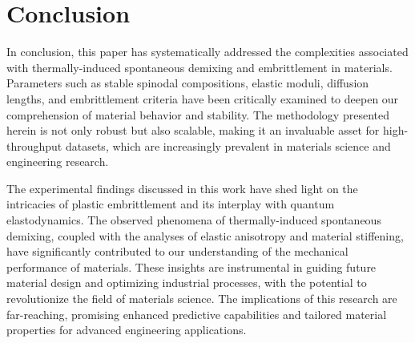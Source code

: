 \section{Conclusion}

In conclusion, this paper has systematically addressed the complexities associated with thermally-induced spontaneous demixing and embrittlement in materials. Parameters such as stable spinodal compositions, elastic moduli, diffusion lengths, and embrittlement criteria have been critically examined to deepen our comprehension of material behavior and stability. The methodology presented herein is not only robust but also scalable, making it an invaluable asset for high-throughput datasets, which are increasingly prevalent in materials science and engineering research.

The experimental findings discussed in this work have shed light on the intricacies of plastic embrittlement and its interplay with quantum elastodynamics. The observed phenomena of thermally-induced spontaneous demixing, coupled with the analyses of elastic anisotropy and material stiffening, have significantly contributed to our understanding of the mechanical performance of materials. These insights are instrumental in guiding future material design and optimizing industrial processes, with the potential to revolutionize the field of materials science. The implications of this research are far-reaching, promising enhanced predictive capabilities and tailored material properties for advanced engineering applications.